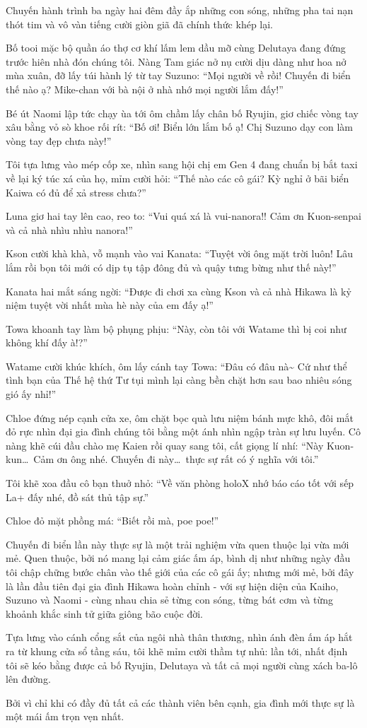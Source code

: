 \documentclass[../main.tex]{subfiles}
\begin{document}
Chuyến hành trình ba ngày hai đêm đầy ắp những con sóng, những pha tai nạn thót tim và vô vàn tiếng cười giòn giã đã chính thức khép lại.

Bố tooi mặc bộ quần áo thợ cơ khí lấm lem dầu mỡ cùng Delutaya đang đứng trước hiên nhà đón chúng tôi. Nàng Tam giác nở nụ cười dịu dàng như hoa nở mùa xuân, đỡ lấy túi hành lý từ tay Suzuno: ``Mọi người về rồi! Chuyến đi biển thế nào ạ? Mike-chan với bà nội ở nhà nhớ mọi người lắm đấy!''

Bé út Naomi lập tức chạy ùa tới ôm chầm lấy chân bố Ryujin, giơ chiếc vòng tay xâu bằng vỏ sò khoe rối rít: ``Bố ơi! Biển lớn lắm bố ạ! Chị Suzuno dạy con làm vòng tay đẹp chưa này!''

Tôi tựa lưng vào mép cốp xe, nhìn sang hội chị em Gen 4 đang chuẩn bị bắt taxi về lại ký túc xá của họ, mỉm cười hỏi: ``Thế nào các cô gái? Kỳ nghỉ ở bãi biển Kaiwa có đủ để xả stress chưa?''

Luna giơ hai tay lên cao, reo to: ``Vui quá xá là vui-nanora!! Cảm ơn Kuon-senpai và cả nhà nhìu nhìu nanora!''

Kson cười khà khà, vỗ mạnh vào vai Kanata: ``Tuyệt vời ông mặt trời luôn! Lâu lắm rồi bọn tôi mới có dịp tụ tập đông đủ và quậy tưng bừng như thế này!''

Kanata hai mắt sáng ngời: ``Được đi chơi xa cùng Kson và cả nhà Hikawa là kỷ niệm tuyệt vời nhất mùa hè này của em đấy ạ!''

Towa khoanh tay làm bộ phụng phịu: ``Này, còn tôi với Watame thì bị coi như không khí đấy à!?''

Watame cười khúc khích, ôm lấy cánh tay Towa: ``Đâu có đâu nà\~{} Cứ như thể tình bạn của Thế hệ thứ Tư tụi mình lại càng bền chặt hơn sau bao nhiêu sóng gió ấy nhỉ!''

Chloe đứng nép cạnh cửa xe, ôm chặt bọc quà lưu niệm bánh mực khô, đôi mắt đỏ rực nhìn đại gia đình chúng tôi bằng một ánh nhìn ngập tràn sự lưu luyến. Cô nàng khẽ cúi đầu chào mẹ Kaien rồi quay sang tôi, cất giọng lí nhí: ``Này Kuon-kun\dots\ Cảm ơn ông nhé. Chuyến đi này\dots\ thực sự rất có ý nghĩa với tôi.''

Tôi khẽ xoa đầu cô bạn thuở nhỏ: ``Về văn phòng holoX nhớ báo cáo tốt với sếp La+ đấy nhé, đồ sát thủ tập sự.''

Chloe đỏ mặt phồng má: ``Biết rồi mà, poe poe!''

Chuyến đi biển lần này thực sự là một trải nghiệm vừa quen thuộc lại vừa mới mẻ. Quen thuộc, bởi nó mang lại cảm giác ấm áp, bình dị như những ngày đầu tôi chập chững bước chân vào thế giới của các cô gái ấy; nhưng mới mẻ, bởi đây là lần đầu tiên đại gia đình Hikawa hoàn chỉnh - với sự hiện diện của Kaiho, Suzuno và Naomi - cùng nhau chia sẻ từng con sóng, từng bát cơm và từng khoảnh khắc sinh tử giữa giông bão cuộc đời.

Tựa lưng vào cánh cổng sắt của ngôi nhà thân thương, nhìn ánh đèn ấm áp hắt ra từ khung cửa sổ tầng sáu, tôi khẽ mỉm cười thầm tự nhủ: lần tới, nhất định tôi sẽ kéo bằng được cả bố Ryujin, Delutaya và tất cả mọi người cùng xách ba-lô lên đường.

Bởi vì chỉ khi có đầy đủ tất cả các thành viên bên cạnh, gia đình mới thực sự là một mái ấm trọn vẹn nhất.
\end{document}
